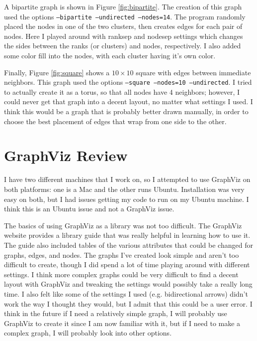 \documentclass[11pt]{article}
\numberwithin{figure}{section}
\begin{document}
A bipartite graph is shown in Figure \ref{fig:bipartite}.  The creation of this graph used the options \texttt{--bipartite --undirected --nodes=14}.  The program randomly placed the nodes in one of the two clusters, then creates edges for each pair of nodes.  Here I played around with ranksep and nodesep settings which changes the sides between the ranks (or clusters) and nodes, respectively.  I also added some color fill into the nodes, with each cluster having it's own color.  

Finally, Figure \ref{fig:square} shows a $10 \times 10$ square with edges between immediate neighbors.  This graph used the options \texttt{--square --nodes=10 --undirected}.  I tried to actually create it as a torus, so that all nodes have 4 neighbors; however, I could never get that graph into a decent layout, no matter what settings I used.  I think this would be a graph that is probably better drawn manually, in order to choose the best placement of edges that wrap from one side to the other.  

\section{GraphViz Review}
I have two different machines that I work on, so I attempted to use GraphViz on both platforms: one is a Mac and the other runs Ubuntu.  Installation was very easy on both, but I had issues getting my code to run on my Ubuntu machine.  I think this is an Ubuntu issue and not a GraphViz issue.  

The basics of using GraphViz as a library was not too difficult.  The GraphViz website provides a library guide that was really helpful in learning how to use it. The guide also included tables of the various attributes that could be changed for graphs, edges, and nodes. The graphs I've created look simple and aren't too difficult to create, though I did spend a lot of time playing around with different settings. I think more complex graphs could be very difficult to find a decent layout with GraphViz and tweaking the settings would possibly take a really long time.  I also felt like some of the settings I used (e.g. bidirectional arrows) didn't work the way I thought they would, but I admit that this could be a user error.  I think in the future if I need a relatively simple graph, I will probably use GraphViz to create it since I am now familiar with it, but if I need to make a complex graph, I will probably look into other options.  
%

%
\end{document}
